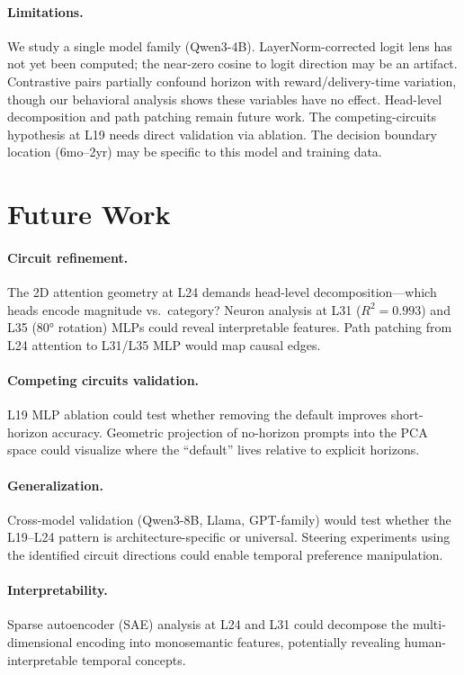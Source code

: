 \documentclass{article}
\begin{document}
\paragraph{Limitations.} We study a single model family (Qwen3-4B). LayerNorm-corrected logit lens has not yet been computed; the near-zero cosine to logit direction may be an artifact. Contrastive pairs partially confound horizon with reward/delivery-time variation, though our behavioral analysis shows these variables have no effect. Head-level decomposition and path patching remain future work. The competing-circuits hypothesis at L19 needs direct validation via ablation. The decision boundary location (6mo--2yr) may be specific to this model and training data.

\section{Future Work}

\paragraph{Circuit refinement.} The 2D attention geometry at L24 demands head-level decomposition---which heads encode magnitude vs.\ category? Neuron analysis at L31 ($R^2 = 0.993$) and L35 (80° rotation) MLPs could reveal interpretable features. Path patching from L24 attention to L31/L35 MLP would map causal edges.

\paragraph{Competing circuits validation.} L19 MLP ablation could test whether removing the default improves short-horizon accuracy. Geometric projection of no-horizon prompts into the PCA space could visualize where the ``default'' lives relative to explicit horizons.

\paragraph{Generalization.} Cross-model validation (Qwen3-8B, Llama, GPT-family) would test whether the L19--L24 pattern is architecture-specific or universal. Steering experiments using the identified circuit directions could enable temporal preference manipulation.

\paragraph{Interpretability.} Sparse autoencoder (SAE) analysis at L24 and L31 could decompose the multi-dimensional encoding into monosemantic features, potentially revealing human-interpretable temporal concepts.
\end{document}
